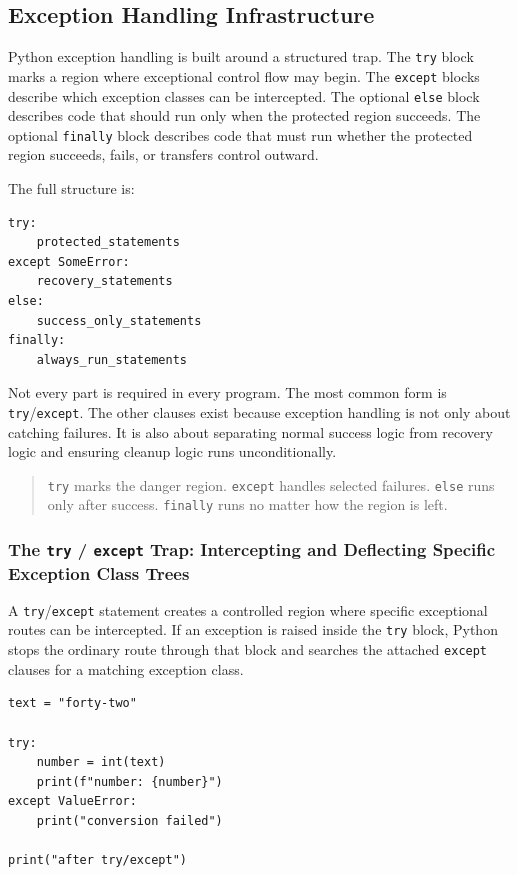 \subsection{Exception Handling Infrastructure}

Python exception handling is built around a structured trap. The \texttt{try} block marks a region where exceptional control flow may begin. The \texttt{except} blocks describe which exception classes can be intercepted. The optional \texttt{else} block describes code that should run only when the protected region succeeds. The optional \texttt{finally} block describes code that must run whether the protected region succeeds, fails, or transfers control outward.

The full structure is:

\begin{verbatim}
try:
    protected_statements
except SomeError:
    recovery_statements
else:
    success_only_statements
finally:
    always_run_statements
\end{verbatim}

Not every part is required in every program. The most common form is \texttt{try}/\texttt{except}. The other clauses exist because exception handling is not only about catching failures. It is also about separating normal success logic from recovery logic and ensuring cleanup logic runs unconditionally.

\begin{quote}
\texttt{try} marks the danger region. \texttt{except} handles selected failures. \texttt{else} runs only after success. \texttt{finally} runs no matter how the region is left.
\end{quote}

\subsubsection{The \texttt{try} / \texttt{except} Trap: Intercepting and Deflecting Specific Exception Class Trees}

A \texttt{try}/\texttt{except} statement creates a controlled region where specific exceptional routes can be intercepted. If an exception is raised inside the \texttt{try} block, Python stops the ordinary route through that block and searches the attached \texttt{except} clauses for a matching exception class.

\begin{verbatim}
text = "forty-two"

try:
    number = int(text)
    print(f"number: {number}")
except ValueError:
    print("conversion failed")

print("after try/except")
\end{verbatim}

